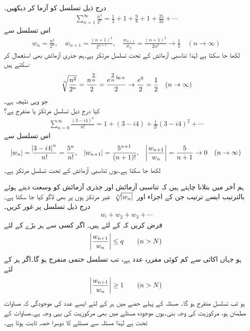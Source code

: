 \quad {}\\
درج ذیل تسلسل کو آزما کر دیکھیں۔
\begin{align*}
\sum_{n=1}^{\infty} \frac{n^2}{2^n}=\frac{1}{2}+1+\frac{9}{8}+1+\frac{25}{32}+\cdots
\end{align*}
اس تسلسل سے 
\begin{align*}
w_n=\frac{n^2}{2^n}, \quad w_{n+1}=\frac{(n+1)^2}{2^{n+1}},\quad \frac{w_{n+1}}{w_n}=\frac{(n+1)^2}{2n^2}\to \frac{1}{2}\quad (n\to\infty)
\end{align*}
لکھا جا سکتا ہے لہٰذا تناسبی آزمائش کے تحت تسلسل مرتکز ہے۔ہم جذری آزمائش بھی استعمال کر سکتے ہیں:
\begin{align*}
\sqrt[\leftroot{-2}n]{\frac{n^2}{2^n}}=\frac{n^{\tfrac{2}{n}}}{2}=\frac{e^{\tfrac{2}{n}\ln n}}{2}\to \frac{e^0}{2}=\frac{1}{2}\quad (n\to\infty)
\end{align*}
جو وہی نتیجہ ہے۔ 
\quad {}\\
کیا درج ذیل تسلسل مرتکز یا منفرج ہے؟
\begin{align*}
\sum_{n=0}^{\infty}\frac{(3-i4)^n}{n!}=1+(3-i4)+\frac{1}{2!}(3-i4)^2+\cdots
\end{align*}
اس تسلسل سے 
\begin{align*}
\abs{w_n}=\frac{\abs{3-i4}^n}{n!}=\frac{5^n}{n!}, \quad \abs{w_{n+1}}=\frac{5^{n+1}}{(n+1)!},\quad \abs{\frac{w_{n+1}}{w_n}}=\frac{5}{n+1}\to 0 \quad (n\to \infty)
\end{align*}
لکھا جا سکتا ہے۔یوں تناسبی آزمائش کے تحت تسلسل مرتکز ہے۔

ہم آخر میں بتلانا چاہتے ہیں کہ تناسبی آزمائش اور جذری آزمائش کو وسعت دیتے ہوئے بالترتیب  ایسے ترتیب جن کے اجزاء  اور 
$\,\sqrt[\leftroot{-2}n]{\abs{w_n}}\,$
غیر مرتکز ہوں پر بھی لاگو کیا جا سکتا ہے۔
\quad {}\\
درج ذیل تسلسل پر غور کریں۔
\begin{align*}
w_!+w_2+w_3+\cdots
\end{align*}
فرض کریں کہ  کے لئے  ہیں۔ اگر کسی  سے ہر بڑے  کے لئے
\begin{align}\label{مساوات_ترتیب_تناسبی_الف}
\abs{\frac{w_{n+1}}{w_n}}\le q\quad \quad (n>N)
\end{align}
ہو جہاں  اکائی سے کم کوئی مقررہ عدد ہے، تب تسلسل حتمی منفرج ہو گا۔اگر ہر  کے لئے 
\begin{align}\label{مساوات_ترتیب_تناسبی_ب}
\abs{\frac{w_{n+1}}{w_n}}\ge 1\quad \quad (n>N)
\end{align}
ہو تب تسلسل منفرج ہو گا۔
\quad
مسئلہ  کے پہلے حصے میں ہر  کے لئے ایسے عدد  کی موجودگی  کہ مساوات  مطمئن ہو، مرکوزیت کی وجہ بنی۔یوں موجودہ مسئلے میں بھی مرکوزیت کی یہی وجہ ہے۔مساوات  کے تحت  ہے لہٰذا   مسئلہ سے مسئلے کا دوسرا حصہ ثابت ہوتا ہے۔

